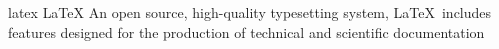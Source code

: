\newglsXsoftware%
{latex}%
{LaTeX}%
{An open source, high-quality typesetting system, \LaTeX\ includes features designed for the production of technical and scientific documentation \cite{website:LaTeX}}%